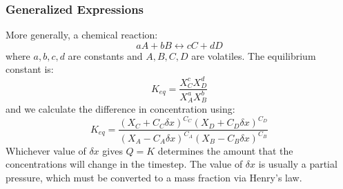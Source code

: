 \subsubsection{Generalized Expressions}
More generally, a chemical reaction: 
\begin{equation}
    aA + bB \leftrightarrow cC + dD
\end{equation}
where $a,b,c,d$ are constants and $A,B,C,D$ are volatiles.  The equilibrium constant is: 
\begin{equation}
    K_{eq} = \frac{X_C^c X_D^d}{X_A^a X_B^b}
\end{equation}
and we calculate the difference in concentration using: 
\begin{equation}
K_{eq} = \frac{(X_C + C_C\delta x)^{C_C} (X_D + C_D\delta x)^{C_D}}{(X_A-C_A\delta x)^{C_A} (X_B-C_B\delta x)^{C_B}}
\end{equation}
Whichever value of $\delta x$ gives $Q=K$ determines the amount that the concentrations will change in the timestep. The value of $\delta x$ is usually a partial pressure, which must be converted to a mass fraction via Henry's law. 

